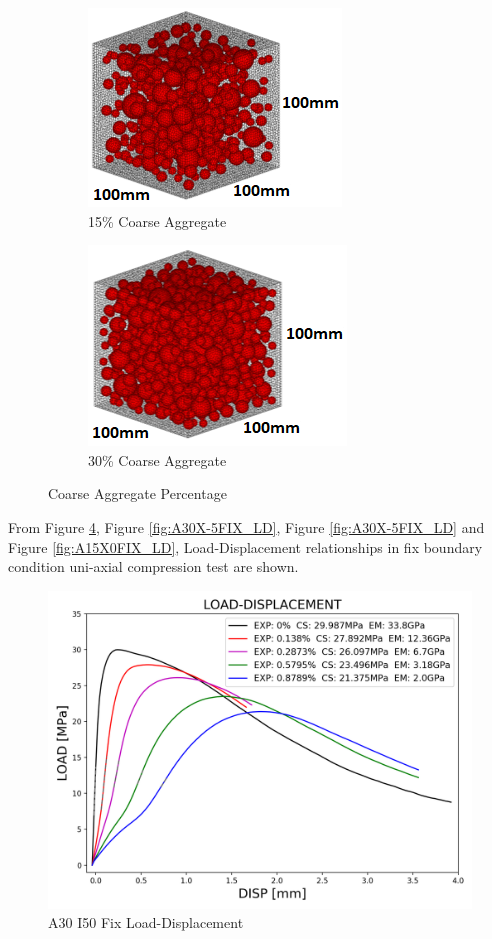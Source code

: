 \begin{figure}[!h]
\centering
\begin{subfigure}{.5\textwidth}
  \centering
  \includegraphics[width=.4\linewidth]{Files/Aggregate/A15.png}
  \caption{15\% Coarse Aggregate}
  \label{fig:A15_model}
\end{subfigure}%
\begin{subfigure}{.5\textwidth}
  \centering
  \includegraphics[width=.4\linewidth]{Files/Aggregate/A30.png}
  \caption{30\% Coarse Aggregate}
  \label{fig:A15_model}
\end{subfigure}
\caption{Coarse Aggregate Percentage}
\end{figure}

From Figure \ref{fig:A30X0FIX_LD}, Figure \ref{fig:A30X-5FIX_LD}, Figure \ref{fig:A30X-5FIX_LD} and Figure \ref{fig:A15X0FIX_LD}, Load-Displacement relationships in fix boundary condition uni-axial compression test are shown.


\begin{figure}[ht!]
\centering
\includegraphics[width=.8\linewidth]{Files/exp_3D/DEF/S13A30FIXX0-LOAD-DISPLACEMENT.png}
  \caption{A30 I50 Fix Load-Displacement}
  \label{fig:A30X0FIX_LD}
\end{figure}


